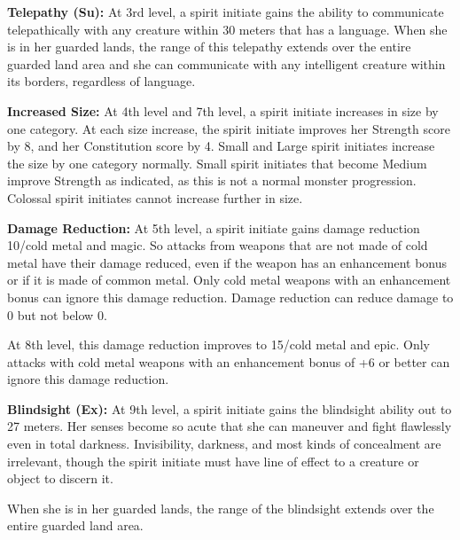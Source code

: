 {\textbf{Telepathy (Su):} At 3rd level, a spirit initiate gains the ability to communicate telepathically with any creature within 30 meters that has a language. When she is in her guarded lands, the range of this telepathy extends over the entire guarded land area and she can communicate with any intelligent creature within its borders, regardless of language.

\textbf{Increased Size:} At 4th level and 7th level, a spirit initiate increases in size by one category. At each size increase, the spirit initiate improves her Strength score by 8, and her Constitution score by 4. Small and Large spirit initiates increase the size by one category normally. Small spirit initiates that become Medium improve Strength as indicated, as this is not a normal monster progression. Colossal spirit initiates cannot increase further in size.

\textbf{Damage Reduction:} At 5th level, a spirit initiate gains damage reduction 10/cold metal and magic. So attacks from weapons that are not made of cold metal have their damage reduced, even if the weapon has an enhancement bonus or if it is made of common metal. Only cold metal weapons with an enhancement bonus can ignore this damage reduction. Damage reduction can reduce damage to 0 but not below 0. %

At 8th level, this damage reduction improves to 15/cold metal and epic. Only attacks with cold metal weapons with an enhancement bonus of +6 or better can ignore this damage reduction.

\textbf{Blindsight (Ex):} At 9th level, a spirit initiate gains the blindsight ability out to 27 meters. Her senses become so acute that she can maneuver and fight flawlessly even in total darkness. Invisibility, darkness, and most kinds of concealment are irrelevant, though the spirit initiate must have line of effect to a creature or object to discern it.

When she is in her guarded lands, the range of the blindsight extends over the entire guarded land area.

}
